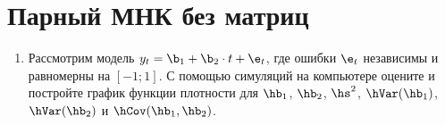 \section{Парный МНК без матриц}

\begin{enumerate}
\item Рассмотрим модель $y_t=\b_1+\b_2 \cdot t + \e_t$, где ошибки $\e_t$ независимы и равномерны на $[-1;1]$. С помощью симуляций на компьютере оцените и постройте график функции плотности для $\hb_1$, $\hb_2$, $\hs^2$, $\hVar(\hb_1)$, $\hVar(\hb_2)$ и $\hCov(\hb_1,\hb_2)$. 
\end{enumerate}